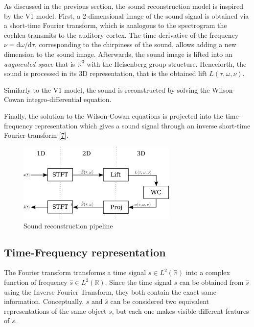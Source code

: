 \documentclass[
  american,
]{article}
\begin{document}
As discussed in the previous section, the sound reconstruction model
is inspired by the V1 model.
First, a 2-dimensional image of the sound signal is obtained via a short-time Fourier transform,
which is analogous to the spectrogram the cochlea transmits to the auditory cortex.
The time derivative of the frequency \(\nu=\mathrm{d}\omega/\mathrm{d}\tau\), corresponding to the chirpiness of the sound,
allows adding a new dimension to the sound image.
Afterwards, the sound image is lifted into an \emph{augmented space} that is \(\mathbb{R}^3\)
with the Heisenberg group structure.
Henceforth, the sound is processed in its 3D representation,
that is the obtained lift \(L(\tau,\omega,\nu)\).

Similarly to the V1 model, the sound is reconstructed by solving
the Wilson-Cowan integro-differential equation.

Finally, the solution to the Wilson-Cowan equations is projected into
the time-frequency representation which gives a sound signal through
an inverse short-time Fourier transform {[}\protect\hyperlink{ref-boscain2021}{7}{]}.

\begin{figure}
\centering
\includegraphics[width=0.7\textwidth,height=\textheight]{img/pipeline.png}
\caption{Sound reconstruction pipeline}
\end{figure}

\hypertarget{time-frequency-representation}{%
\subsection{Time-Frequency representation}\label{time-frequency-representation}}

The Fourier transform transforms a time signal \(s\in L^2(\mathbb{R})\)
into a complex function of frequency \(\hat s\in L^2(\mathbb{R})\).
Since the time signal \(s\) can be obtained from \(\hat s\)
using the Inverse Fourier Transform, they both contain
the exact same information.
Conceptually, \(s\) and \(\hat s\) can be considered two equivalent
representations of the same object \(s\), but each one
makes visible different features of \(s\).
\end{document}
